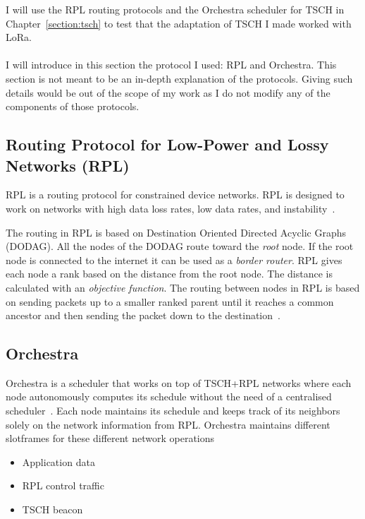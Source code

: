 I will use the RPL routing protocols and the Orchestra scheduler for TSCH in
Chapter~\ref{section:tsch} to test that the adaptation of TSCH I made worked
with LoRa.

\paragraph{}

I will introduce in this section the protocol I used: RPL and Orchestra.
This section is not meant to be an in-depth explanation of the protocols.
Giving such details would be out of the scope of my work as I do not modify any
of the components of those protocols.

\subsection{Routing Protocol for Low-Power and Lossy Networks (RPL)}

RPL is a routing protocol for constrained device networks.
RPL is designed to work on networks with high data loss rates, low data rates, and
instability~\cite{rfc6550}.

The routing in RPL is based on Destination Oriented Directed Acyclic Graphs (DODAG).
All the nodes of the DODAG route toward the \emph{root} node.
If the root node is connected to the internet it can be used as a \emph{border
router}.
RPL gives each node a rank based on the distance from the root node.
The distance is calculated with an \emph{objective function}.
The routing between nodes in RPL is based on sending packets up to a smaller
ranked parent until it reaches a common ancestor and then sending the packet down
to the destination~\cite{duquennoy2015}.

\subsection{Orchestra}

Orchestra is a scheduler that works on top of TSCH+RPL
networks where each node autonomously computes its schedule without the
need of a centralised scheduler~\cite{duquennoy2015}.
Each node maintains its schedule and keeps track of its neighbors solely
on the network information from RPL.
Orchestra maintains different slotframes for these different network operations

\begin{itemize}
  \item Application data
  \item RPL control traffic
  \item TSCH beacon
\end{itemize}

